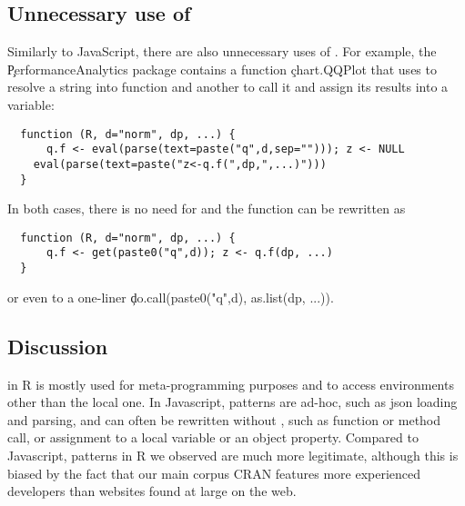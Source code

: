 \documentclass[review,screen,acmsmall,anonymous=true]{acmart}
\newcommand{\authorcomment}[3]{\xspace\textcolor{#1}{{\bf #2} #3}\xspace}
\newcommand{\todo}[1]{\authorcomment{red}{TODO}{#1}}
\begin{document}



\subsection{Unnecessary use of \eval}

Similarly to JavaScript, there are also unnecessary uses of \eval. For example,
the \c{PerformanceAnalytics} package contains a function \c{chart.QQPlot} that
uses \eval to resolve a string into function and another to call it and assign
its results into a variable:
\begin{lstlisting}
  function (R, d="norm", dp, ...) {
	  q.f <- eval(parse(text=paste("q",d,sep=""))); z <- NULL
  	eval(parse(text=paste("z<-q.f(",dp,",...)")))
  }
\end{lstlisting}
  In both cases, there is no need for \eval and the function can be rewritten as
\begin{lstlisting}
  function (R, d="norm", dp, ...) {
	  q.f <- get(paste0("q",d)); z <- q.f(dp, ...)
  }
\end{lstlisting}
or even to a one-liner \c{do.call(paste0("q",d), as.list(dp, ...))}.


\subsection{Discussion}

\Eval in R is mostly used for meta-programming purposes and to access
environments other than the local one. In Javascript, patterns are ad-hoc, such
as json loading and parsing, and can often be rewritten without \eval, such as
function or method call, or assignment to a local variable or an object
property. Compared to Javascript, \eval patterns in R we observed are much more
legitimate, although this is biased by the fact that our main corpus CRAN
features more experienced developers than websites found at large on the web.
\end{document}
